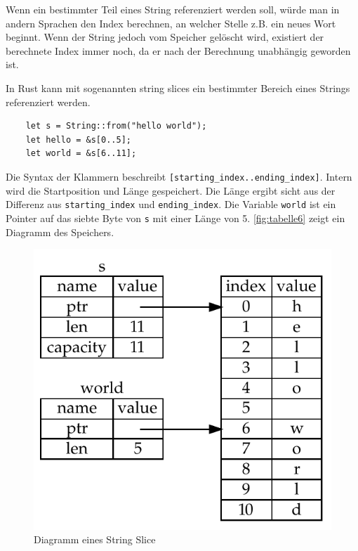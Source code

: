Wenn ein bestimmter Teil eines String referenziert werden soll, würde man in andern Sprachen den Index berechnen, an welcher Stelle z.B. ein neues Wort beginnt. Wenn der String jedoch vom Speicher gelöscht wird, existiert der berechnete Index immer noch, da er nach der Berechnung unabhängig geworden ist.

In Rust kann mit sogenannten \glqq string slices\grqq{} ein bestimmter Bereich eines Strings referenziert werden.

\begin{lstlisting}
    let s = String::from("hello world");
    let hello = &s[0..5];
    let world = &s[6..11];
\end{lstlisting}

Die Syntax der Klammern beschreibt \verb"[starting_index..ending_index]". Intern wird die Startposition und Länge gespeichert. Die Länge ergibt sicht aus der Differenz aus \verb"starting_index" und \verb"ending_index". Die Variable \verb"world" ist ein Pointer auf das siebte Byte von \verb"s" mit einer Länge von 5. \autoref{fig:tabelle6} zeigt ein Diagramm des Speichers.

\begin{figure}[htbp]
    \centering
    \includegraphics[scale=0.9]{Programmierung/Tabelle6.pdf}
    \caption{Diagramm eines String Slice}
    \label{fig:tabelle6}
\end{figure}

